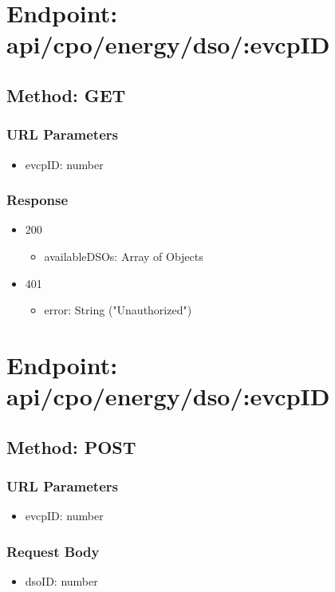 \section*{Endpoint: api/cpo/energy/dso/:evcpID}
\subsection*{Method: GET}
\subsubsection*{URL Parameters}
\begin{itemize}
    \item evcpID: number
\end{itemize}
\subsubsection*{Response}
\begin{itemize}
    \item 200
          \begin{itemize}
              \item availableDSOs: Array of Objects
          \end{itemize}
    \item 401
          \begin{itemize}
              \item error: String ("Unauthorized")
          \end{itemize}
\end{itemize}

\section*{Endpoint: api/cpo/energy/dso/:evcpID}
\subsection*{Method: POST}
\subsubsection*{URL Parameters}
\begin{itemize}
    \item evcpID: number
\end{itemize}
\subsubsection*{Request Body}
\begin{itemize}
    \item dsoID: number
\end{itemize}
